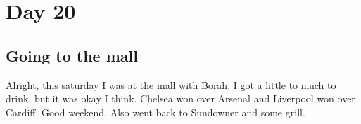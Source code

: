 \section{Day 20}
\subsection{Going to the mall}
Alright, this saturday I was at the mall with Borah.
I got a little to much to drink, but it was okay I think.
Chelsea won over Arsenal and Liverpool won over Cardiff.
Good weekend.
Also went back to Sundowner and some grill.